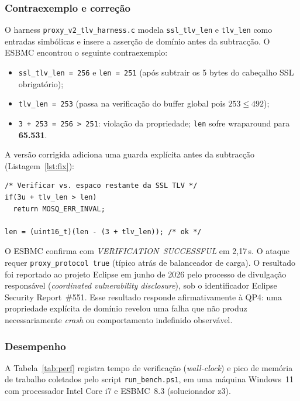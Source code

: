 \documentclass[conference]{IEEEtran}
\begin{document}
\subsubsection*{Contraexemplo e corre\c{c}\~ao}
O harness \texttt{proxy\_v2\_tlv\_harness.c} modela \texttt{ssl\_tlv\_len} e
\texttt{tlv\_len} como entradas simb\'olicas e insere a asser\c{c}\~ao de
dom\'inio antes da subtrac\c{c}\~ao. O ESBMC encontrou o seguinte
contraexemplo:
\begin{itemize}
    \item \texttt{ssl\_tlv\_len~=~256} e \texttt{len~=~251} (ap\'os subtrair
          os 5 bytes do cabe\c{c}alho SSL obrigat\'orio);
    \item \texttt{tlv\_len~=~253} (passa na verifica\c{c}\~ao do buffer global
          pois $253 \leq 492$);
    \item \texttt{3~+~253~=~256~>~251}: viola\c{c}\~ao da propriedade;
          \texttt{len} sofre wraparound para \textbf{65.531}.
\end{itemize}
A vers\~ao corrigida adiciona uma guarda expl\'icita antes da subtrac\c{c}\~ao
(Listagem~\ref{lst:fix}):

\begin{lstlisting}[caption={Corre\c{c}\~ao proposta para \texttt{read\_tlv\_ssl}},label=lst:fix]
/* Verificar vs. espaco restante da SSL TLV */
if(3u + tlv_len > len)
  return MOSQ_ERR_INVAL;

len = (uint16_t)(len - (3 + tlv_len)); /* ok */
\end{lstlisting}

\noindent O ESBMC confirma com
\emph{VERIFICATION~SUCCESSFUL} em 2,17\,s. O ataque requer
\texttt{proxy\_protocol~true} (t\'ipico atr\'as de balanceador de carga).
O resultado foi reportado ao projeto Eclipse em junho de 2026 pelo processo de
divulga\c{c}\~ao respons\'avel (\emph{coordinated vulnerability disclosure}),
sob o identificador Eclipse Security Report~\#551.
Esse resultado responde afirmativamente \`a QP4: uma propriedade expl\'icita de
dom\'inio revelou uma falha que n\~ao produz necessariamente \emph{crash} ou
comportamento indefinido observ\'avel.

\subsubsection{Desempenho}
A Tabela~\ref{tab:perf} registra tempo de verifica\c{c}\~ao (\emph{wall-clock}) e pico
de mem\'oria de trabalho coletados pelo script \texttt{run\_bench.ps1}, em uma
m\'aquina Windows~11 com processador Intel Core i7 e ESBMC~8.3 (solucionador z3).
\end{document}

